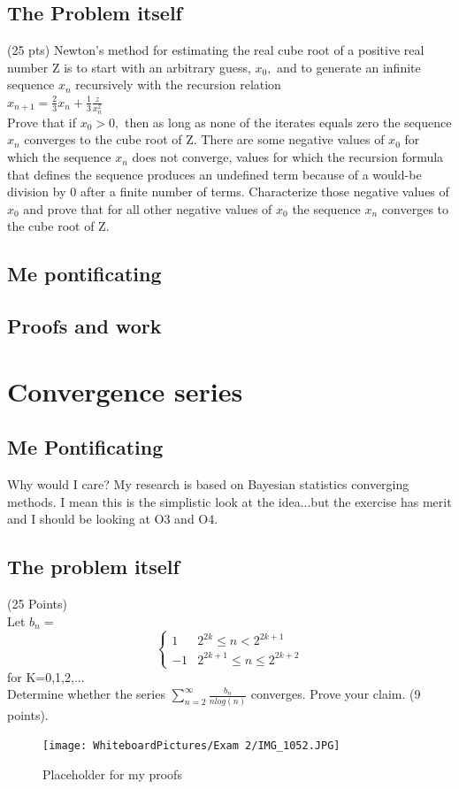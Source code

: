 \subsection{The Problem itself}
(25 pts) Newton's method for estimating the real cube root of a positive real number Z is to start with an arbitrary guess, $x_0,$ and to generate an infinite sequence ${x_n}$ recursively with the recursion relation \\ 
$x_{n+1}=\frac{2}{3}x_{n}+\frac{1}{3}\frac{z}{x_n^2}$\\ 

Prove that if $x_0 > 0, $ then as long as none of the iterates equals zero the sequence ${x_n}$ converges to the cube root of Z. There are some negative values of $x_0$ for which the sequence ${x_n}$ does not converge, values for which the recursion formula that defines the sequence produces an undefined term because of a would-be division by 0 after a finite number of terms. Characterize those negative values of $x_0$ and prove that for all other negative values of $x_0$ the sequence ${x_n}$ converges to the cube root of Z.

\subsection{Me pontificating}

\subsection{Proofs and work }


\section{Convergence series}


\subsection{Me Pontificating}
Why would I care? My research is based on Bayesian statistics converging methods. I mean this is the simplistic look at the idea...but the exercise has merit and I should be looking at O3 and O4.  
\subsection{The problem itself}
(25 Points) \\ 
Let $b_n=$ \[ \begin{cases} 
      1 & 2^{2k}\leq n <2^{2k+1} \\
      -1 & 2^{2k+1} \leq n\leq 2^{2k+2} 
   \end{cases}
\] 
for K=0,1,2,... \\ 
Determine whether the series $\sum_{n=2}^\infty \frac{b_n}{n log(n)}$ converges. Prove your claim. (9 points). \\ 
\begin{figure}[h]\begin{center}\texttt{[image: WhiteboardPictures/Exam 2/IMG\_1052.JPG]}
\caption{Placeholder for my proofs} \label{fig:Euler_pic}\end{center}\end{figure} 

